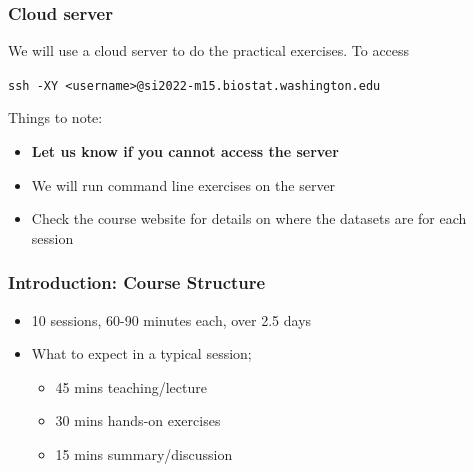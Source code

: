 \documentclass{beamer}
\begin{document}
\begin{frame}[fragile]
	\frametitle{\bf Cloud server}
	
	We will use a cloud server to do the practical exercises. To access 
	{\color{red}
		
		\verb+ssh -XY <username>@si2022-m15.biostat.washington.edu+
	}

	\vspace{1em}
	Things to note:
	\begin{itemize}
		\item {\bf Let us know if you cannot access the server}
		\item We will run command line exercises on the server
		\item Check the course website for details on where the datasets are for each session
	\end{itemize}
\end{frame}







\begin{frame}
\frametitle{\bf Introduction: Course Structure}
\begin{itemize}
\item 10 sessions, 60-90 minutes each, over 2.5 days
\item What to expect in a typical session;
\begin{itemize} 
\item 45 mins teaching/lecture 
\item 30 mins hands-on exercises
\item 15 mins summary/discussion
\end{itemize}
\end{itemize}
\end{frame}
\end{document}
